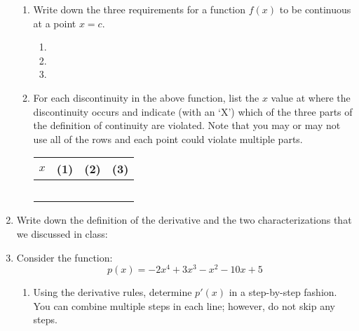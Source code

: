 \documentclass[letterpaper,12pt,fleqn]{article}
\begin{document}
\begin{enumerate}[left=0pt]
  \begin{enumerate}
  \item Write down the three requirements for a function \(f(x)\) to be continuous at a point \(x=c\).
    \begin{enumerate}[label={\arabic*)}]
    \item
    \item
    \item
    \end{enumerate}

    \bigskip
    
  \item For each discontinuity in the above function, list the \(x\) value at where the discontinuity occurs and indicate
    (with an `X') which of the three parts of the definition of continuity are violated.  Note that you may or may not use all
    of the rows and each point could violate multiple parts.

    \bigskip

    \begin{tabular}{|p{0.5in}|c|c|c|}
      \hline
      \(x\) & (1) & (2) & (3) \\
      \hline
      & & & \\
      \hline
      & & & \\
      \hline
      & & & \\
      \hline
      & & & \\
      \hline
      & & & \\
      \hline
    \end{tabular}
  \end{enumerate}

  \newpage

\item Write down the definition of the derivative and the two characterizations that we discussed in class:

  \bigskip

\item Consider the function:
  \[p(x)=-2x^4+3x^3-x^2-10x+5\]
  \begin{enumerate}
  \item Using the derivative rules, determine \(p'(x)\) in a step-by-step fashion.  You can combine multiple steps in each
    line; however, do not skip any steps.


\end{enumerate}
\end{enumerate}
\end{document}
